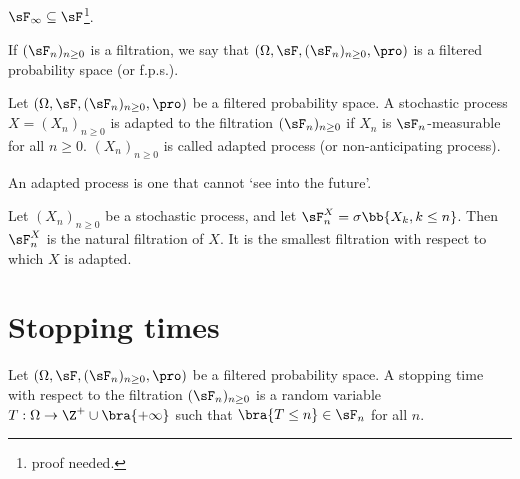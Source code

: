 \begin{remark}
$\sF_\infty\subseteq \sF$\footnote{proof needed.}.%
\end{remark}

\begin{definition}
If $(\sF_n)_{n\geq 0}$ is a filtration, we say that $(\Omega,\sF, (\sF_n)_{n\geq 0},\pro)$ is a filtered probability space (or f.p.s.).
\end{definition}

\begin{definition}\label{def:adapted_process_discrete}
Let $(\Omega,\sF, (\sF_n)_{n\geq 0},\pro)$ be a filtered probability space. A stochastic process $X = (X_n)_{n\geq 0}$ is adapted to the filtration $(\sF_n)_{n \geq 0}$ if $X_n$ is $\sF_n$-measurable for all $n\geq 0$. $(X_n)_{n\geq 0}$ is called adapted process (or non-anticipating process).
\end{definition}

\begin{remark}
An adapted process is one that cannot `see into the future'.
\end{remark}

\begin{definition}
Let $(X_n)_{n\geq 0}$ be a stochastic process, and let $\sF^X_n = \sigma\bb{X_k, k \leq n}$. Then $\sF^X_n$ is the natural filtration of $X$. It is the smallest filtration with respect to which $X$ is adapted.
\end{definition}

\section{Stopping times}

\begin{definition}
Let $(\Omega,\sF, (\sF_n)_{n\geq 0},\pro)$ be a filtered probability space. A stopping time with respect to the filtration $(\sF_n)_{n\geq 0}$ is a random variable $T:\Omega \to \Z^+\cup \bra{+\infty}$ such that $\bra{T \leq n} \in \sF_n$ for all $n$.
\end{definition}


